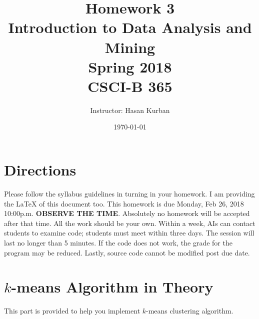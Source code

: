 \documentclass{article}
\begin{document}
\title{Homework 3\\ Introduction to Data Analysis and Mining \\ Spring 2018\\ CSCI-B 365}         %
\author{Instructor: Hasan Kurban}        %
\date{\today}          %
\maketitle
\makeatother     %
\pagestyle{plain}
\section*{Directions}
Please follow the syllabus guidelines in turning in your homework.  I am providing the \LaTeX{} of this document too. This homework is due Monday, Feb  26, 2018 10:00p.m. \textbf{OBSERVE THE  TIME}. Absolutely no homework will be accepted after that time. All the work should be your own.  Within a week, AIs can contact students to examine code; students must meet within three days.  The session will last no longer than 5 minutes.  If the code does not work, the grade for the program may be reduced.  Lastly, source code cannot be
 modified post due date.
 
 
 
\section*{ $k$-means Algorithm in Theory}
This part is provided to help you implement $k$-means clustering algorithm.
\end{document}
